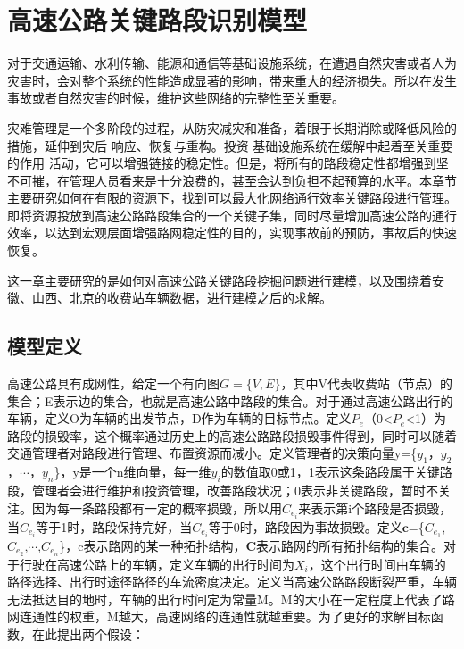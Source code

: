 
\chapter{高速公路关键路段识别模型}
		对于交通运输\parencite{NewmanBasic}、水利传输\parencite{test}、能源和通信等基础设施系统，在遭遇自然灾害或者人为灾害时，会对整个系统的性能造成显著的影响，带来重大的经济损失。所以在发生事故或者自然灾害的时候，维护这些网络的完整性至关重要。

		灾难管理是一个多阶段的过程，从防灾减灾和准备，着眼于长期消除或降低风险的措施，延伸到灾后 响应、恢复与重构。投资 基础设施系统在缓解中起着至关重要的作用 活动，它可以增强链接的稳定性。但是，将所有的路段稳定性都增强到坚不可摧，在管理人员看来是十分浪费的，甚至会达到负担不起预算的水平。本章节主要研究如何在有限的资源下，找到可以最大化网络通行效率关键路段进行管理。即将资源投放到高速公路路段集合的一个关键子集，同时尽量增加高速公路的通行效率，以达到宏观层面增强路网稳定性的目的，实现事故前的预防，事故后的快速恢复。

		这一章主要研究的是如何对高速公路关键路段挖掘问题进行建模，以及围绕着安徽、山西、北京的收费站车辆数据，进行建模之后的求解。

		\section{模型定义}
			高速公路具有成网性，给定一个有向图$G=\{V,E\}$，其中V代表收费站（节点）的集合；E表示边的集合，也就是高速公路中路段的集合。对于通过高速公路出行的车辆，定义O为车辆的出发节点，D作为车辆的目标节点。定义$P_e$（0<$P_e$<1）为路段的损毁率，这个概率通过历史上的高速公路路段损毁事件得到，同时可以随着交通管理者对路段进行管理、布置资源而减小。定义管理者的决策向量y=\{$y_1$，$y_2$，$\cdots$，$y_n$\}，y是一个n维向量，每一维$y_i$的数值取0或1，1表示这条路段属于关键路段，管理者会进行维护和投资管理，改善路段状况；0表示非关键路段，暂时不关注。因为每一条路段都有一定的概率损毁，所以用$C_{e_i}$来表示第i个路段是否损毁，当$C_{e_i}$等于1时，路段保持完好，当$C_{e_i}$等于0时，路段因为事故损毁。定义$\bm{c}$=\{$C_{e_1}$,$C_{e_2}$,$\cdots$,$C_{e_n}$\}，c表示路网的某一种拓扑结构，$\bm{C}$表示路网的所有拓扑结构的集合。对于行驶在高速公路上的车辆，定义车辆的出行时间为$X_i$，这个出行时间由车辆的路径选择、出行时途径路径的车流密度决定。定义当高速公路路段断裂严重，车辆无法抵达目的地时，车辆的出行时间定为常量M。M的大小在一定程度上代表了路网连通性的权重，M越大，高速网络的连通性就越重要。为了更好的求解目标函数，在此提出两个假设：

